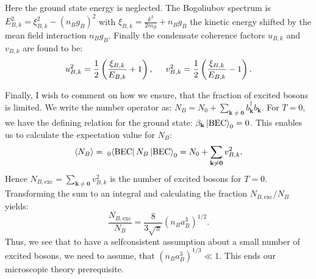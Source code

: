 Here the ground state energy is neglected. The Bogoliubov spectrum is $E_{B,k}^2 = \xi_{B,k}^2-(n_Bg_B)^2$ with $\xi_{B,k} = \frac{k^2}{2m_B}+n_Bg_B$ the kinetic energy shifted by the mean field interaction $n_Bg_B$. Finally the condensate coherence factors $u_{B,k}$ and $v_{B,k}$ are found to be: 
\begin{equation}
u_{B,k}^2 = \frac{1}{2}\left(\frac{\xi_{B,k}}{ E_{B,k}}+1 \right), \hspace{0.5cm} v_{B,k}^2 = \frac{1}{2}\left(\frac{\xi_{B,k}}{ E_{B,k}}-1 \right).
\end{equation}

Finally, I wish to comment on how we ensure, that the fraction of excited bosons is limited. We write the number operator as: $N_B = N_0 + \sum_{\mathbf{k}\neq \mathbf{0}} b^\dagger_{\mathbf{k}}b_{\mathbf{k}}$. For $T=0$, we have the defining relation for the ground state: $\beta_{\mathbf{k}}\ket{\text{BEC}}_0 = 0$. This enables us to calculate the expectation value for $N_B$:
\begin{equation}
\braket{N_B} =\;_{0}\!\bra{\text{BEC}} N_B \ket{\text{BEC}}_0 = N_0 + \sum_{\mathbf{k}\neq \mathbf{0}} v^2_{B,k}.\nonumber
\end{equation} 
Hence $N_{B,\text{exc}} = \sum_{\mathbf{k}\neq \mathbf{0}} v^2_{B,k}$ is the number of excited bosons for $T=0$. Transforming the sum to an integral and calculating the fraction $N_{B,\text{exc}}/N_B$ yields:
\begin{equation}
\frac{N_{B,\text{exc}}}{N_B} = \frac{8}{3\sqrt{\pi}}(n_Ba_B^3)^{1/2}.
\label{eq.excitedbosonsBEC}
\end{equation}
Thus, we see that to have a selfconsistent assumption about a small number of excited bosons, we need to assume, that $(n_Ba_B^3)^{1/3}\ll 1$. This ends our microscopic theory prerequisite. 

